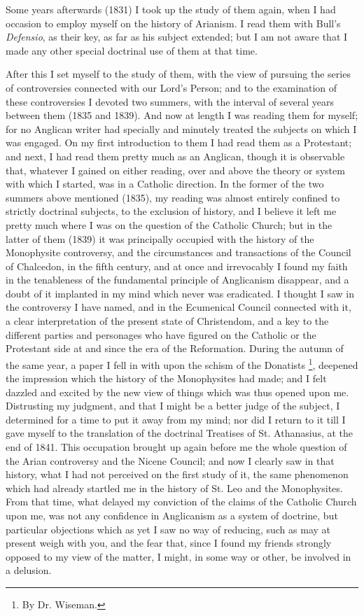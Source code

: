 Some years afterwards (1831) I took up the study of them again,
when I had occasion to employ myself on the history of Arianism. I
read them with Bull's \emph{Defensio}, as their key, as far as his
subject extended; but I am not aware that I made any other special
doctrinal use of them at that time.

After this I set myself to the study of them, with the view of
pursuing the series of controversies connected with our Lord's Person;
and to the examination of these controversies I devoted two summers,
with the interval of several years between them (1835 and 1839). And
now at length I was reading them for myself; for no Anglican writer
had specially and minutely treated the subjects on which I was
engaged. On my first introduction to them I had read them as a
Protestant; and next, I had read them pretty much as an Anglican,
though it is observable that, whatever I gained on either reading,
over and above the theory or system with which I started, was in a
Catholic direction. In the former of the two summers above mentioned
(1835), my reading was almost entirely confined to strictly doctrinal
subjects, to the exclusion of history, and I believe it left me pretty
much where I was on the question of the Catholic Church; but in the
latter of them (1839) it was principally occupied with the history of
the Monophysite controversy, and the circumstances and transactions of
the Council of Chalcedon, in the fifth century, and at once and
irrevocably I found my faith in the tenableness of the fundamental
principle of Anglicanism disappear, and a doubt of it implanted in my
mind which never was eradicated. I thought I saw in the controversy I
have named, and in the Ecumenical Council connected with it, a clear
interpretation of the present state of Christendom, and a key to the
different parties and personages who have figured on the Catholic or
the Protestant side at and since the era of the Reformation. During
the autumn of the same year, a paper I fell in with upon the schism of
the Donatists \footnote{By Dr. Wiseman.}, deepened
the impression which the history of the Monophysites had made; and I
felt dazzled and excited by the new view of things which was thus
opened upon me. Distrusting my judgment, and that I might be a better
judge of the subject, I determined for a time to put it away from my
mind; nor did I return to it till I gave myself to the translation of
the doctrinal Treatises of St. Athanasius, at the end of 1841. This
occupation brought up again before me the whole question of the Arian
controversy and the Nicene Council; and now I clearly saw in that
history, what I had not perceived on the first study of it, the same
phenomenon which had already startled me in the history of St. Leo and
the Monophysites. From that time, what delayed my conviction of the
claims of the Catholic Church upon me, was not any confidence in
Anglicanism as a system of doctrine, but particular objections which
as yet I saw no way of reducing, such as may at present weigh with
you, and the fear that, since I found my friends strongly opposed to
my view of the matter, I might, in some way or other, be involved in a
delusion.

